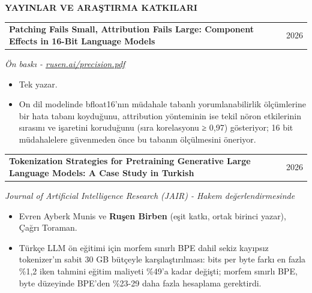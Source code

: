 \documentclass[11pt,a4paper]{article}
\makeatletter
\newcommand{\cvlink}[2]{\href{#1}{\textcolor{linkblue}{#2}}}
\newcommand{\cvsection}[3][5]{%
  \par\Needspace*{#1\baselineskip}\vspace{6pt}%
  {\bfseries\fontsize{11}{13}\selectfont #3}\par\nobreak
  \vspace{3pt}{\color{muted}\hrule height 0.4pt}\nobreak\vspace{6pt}%
}
\newcommand{\cvheading}[2]{%
  \begin{tabularx}{\linewidth}{@{}>{\raggedright\arraybackslash}X@{\hspace{10pt}}r@{}}%
  \textbf{#1} & {\small\color{muted}#2}\\
  \end{tabularx}\par\nobreak
}
\newenvironment{cvpoints}{\begin{itemize}[leftmargin=12pt,itemsep=2pt,topsep=2pt,parsep=0pt]\small}{\end{itemize}}
\makeatother
\begin{document}
\cvsection{}{YAYINLAR VE ARAŞTIRMA KATKILARI}
\begin{minipage}{\linewidth}\raggedright
\cvheading{Patching Fails Small, Attribution Fails Large: Component Effects in 16-Bit Language Models}{2026}
{\small{}\itshape{}\color{muted}Ön baskı - \cvlink{https://rusen.ai/precision.pdf}{rusen.ai/precision.pdf}}\hfill{\small{}%
%
}\par\vspace{2pt}
\begin{cvpoints}
\item Tek yazar.
\item On dil modelinde bfloat16’nın müdahale tabanlı yorumlanabilirlik ölçümlerine bir hata tabanı koyduğunu, attribution yönteminin ise tekil nöron etkilerinin sırasını ve işaretini koruduğunu (sıra korelasyonu ≥ 0,97) gösteriyor; 16 bit müdahalelere güvenmeden önce bu tabanın ölçülmesini öneriyor.
\end{cvpoints}
\end{minipage}\par\vspace{5pt}
\begin{minipage}{\linewidth}\raggedright
\cvheading{Tokenization Strategies for Pretraining Generative Large Language Models: A Case Study in Turkish}{2026}
{\small{}\itshape{}\color{muted}Journal of Artificial Intelligence Research (JAIR) - Hakem değerlendirmesinde}\hfill{\small{}%
%
}\par\vspace{2pt}
\begin{cvpoints}
\item Evren Ayberk Munis ve \textbf{Ruşen Birben} (eşit katkı, ortak birinci yazar), Çağrı Toraman.
\item Türkçe LLM ön eğitimi için morfem sınırlı BPE dahil sekiz kayıpsız tokenizer’ın sabit 30 GB bütçeyle karşılaştırılması: bits per byte farkı en fazla \%1,2 iken tahmini eğitim maliyeti \%49’a kadar değişti; morfem sınırlı BPE, byte düzeyinde BPE’den \%23-29 daha fazla hesaplama gerektirdi.
\end{cvpoints}
\end{minipage}\par\vspace{5pt}
\end{document}
